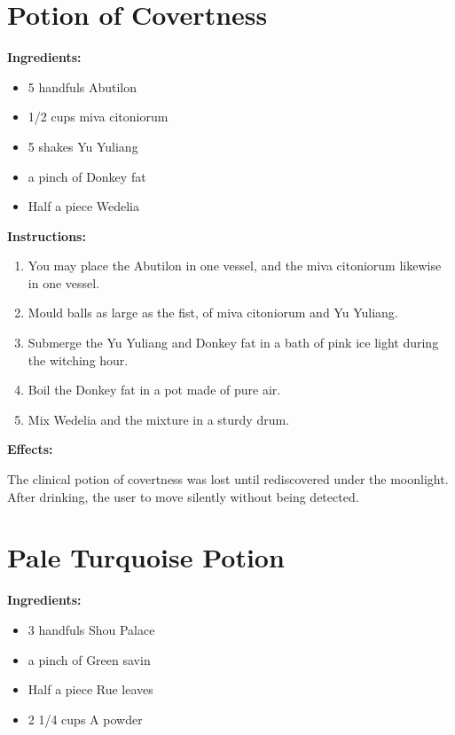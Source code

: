 \documentclass{article}
\begin{document}
\newpage
\section*{Potion of Covertness}

\textbf{Ingredients:}

\begin{itemize}
  \item 5 handfuls Abutilon
  \item 1/2 cups miva citoniorum
  \item 5 shakes Yu Yuliang
  \item a pinch of Donkey fat
  \item Half a piece Wedelia
\end{itemize}

\textbf{Instructions:}

\begin{enumerate}
  \item You may place the Abutilon in one vessel, and the miva citoniorum likewise in one vessel.
  \item Mould balls as large as the fist, of miva citoniorum and Yu Yuliang.
  \item Submerge the Yu Yuliang and Donkey fat in a bath of pink ice light during the witching hour.
  \item Boil the Donkey fat in a pot made of pure air.
  \item Mix Wedelia and the mixture in a sturdy drum.
\end{enumerate}

\textbf{Effects:}

The clinical potion of covertness was lost until rediscovered under the moonlight. After drinking, the user to move silently without being detected.

\newpage
\section*{Pale Turquoise Potion}

\textbf{Ingredients:}

\begin{itemize}
  \item 3 handfuls Shou Palace
  \item a pinch of Green savin
  \item Half a piece Rue leaves
  \item 2 1/4 cups A powder
\end{itemize}
\end{document}
